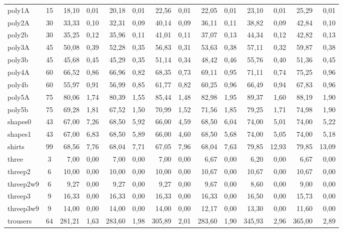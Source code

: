 \documentclass{article}
\newcommand{\lgray}{\cellcolor{lightgray}}
\begin{document}
\begin{adjustwidth}{-2cm}{-2.5 cm}
\begin{threeparttable}[!htb]
{\begin{tabular}{|l|c|rr|rr|rr|rr|rr|rr|}
            poly1A &15  &\lgray18,10 &0,01  &20,18 &0,01  &22,56 &0,01  &22,05 &0,01  &23,10 &0,01  &25,29 &0,01 \\
            poly2A &30  &33,33 &0,10  &\lgray32,31 &0,09  &40,14 &0,09  &36,11 &0,11  &38,82 &0,09  &42,84 &0,10 \\
            poly2b &30  &\lgray35,25 &0,12  &35,96 &0,11  &41,01 &0,11  &37,07 &0,13  &44,34 &0,12  &42,82 &0,13 \\
            poly3A &45  &50,08 &0,39  &52,28 &0,35  &56,83 &0,31  &53,63 &0,38  &57,11 &0,32  &59,87 &0,38 \\
            poly3b &45  &45,68 &0,45  &\lgray45,29 &0,35  &51,14 &0,34  &48,42 &0,46  &55,76 &0,40  &51,36 &0,45 \\
            poly4A &60  &66,52 &0,86  &66,96 &0,82  &68,35 &0,73  &69,11 &0,95  &71,11 &0,74  &75,25 &0,96 \\
            poly4b &60  &\lgray55,97 &0,91  &56,99 &0,85  &61,77 &0,82  &60,25 &0,96  &66,49 &0,94  &67,83 &0,96 \\
            poly5A &75  &\lgray80,06 &1,74  &80,39 &1,55  &85,44 &1,48  &82,98 &1,95  &89,37 &1,60  &88,19 &1,90 \\
            poly5b &75  &69,28 &1,81  &\lgray67,52 &1,50  &70,99 &1,52  &71,56 &1,85  &79,25 &1,71  &74,98 &1,90 \\
            shapes0 &43  &67,00 &7,26  &68,50 &5,92  &\lgray66,00 &4,59  &68,50 &6,04  &74,00 &5,01  &74,00 &5,22 \\
            shapes1 &43  &67,00 &6,83  &68,50 &5,89  &\lgray66,00 &4,60  &68,50 &5,68  &74,00 &5,05  &74,00 &5,18 \\
            shirts &99  &68,56 &7,76  &68,04 &7,71  &\lgray67,05 &7,96  &68,04 &7,63  &79,85 &12,93  &79,85 &13,09 \\
            three &3  &7,00 &0,00  &7,00 &0,00  &7,00 &0,00  &6,67 &0,00  &\lgray6,20 &0,00  &6,67 &0,00 \\
            threep2 &6  &\lgray10,00 &0,00  &\lgray10,00 &0,00  &\lgray10,00 &0,00  &10,67 &0,00  &10,67 &0,00  &10,67 &0,00 \\
            threep2w9 &6  &9,27 &0,00  &9,27 &0,00  &9,27 &0,00  &9,67 &0,00  &\lgray8,60 &0,00  &9,00 &0,00 \\
            threep3 &9  &16,33 &0,00  &16,33 &0,00  &16,33 &0,00  &16,33 &0,00  &16,50 &0,00  &\lgray15,73 &0,00 \\
            threep3w9 &9  &14,00 &0,00  &14,00 &0,00  &14,00 &0,00  &12,17 &0,00  &13,30 &0,00  &\lgray11,60 &0,00 \\
            trousers &64  &\lgray281,21 &1,63  &283,60 &1,98  &305,89 &2,01  &283,60 &1,90  &345,93 &2,96  &365,00 &2,89 \\
            \hline
        \end{tabular}
    }
    \label{tab:t1}
\end{threeparttable}\end{adjustwidth}
\end{document}
